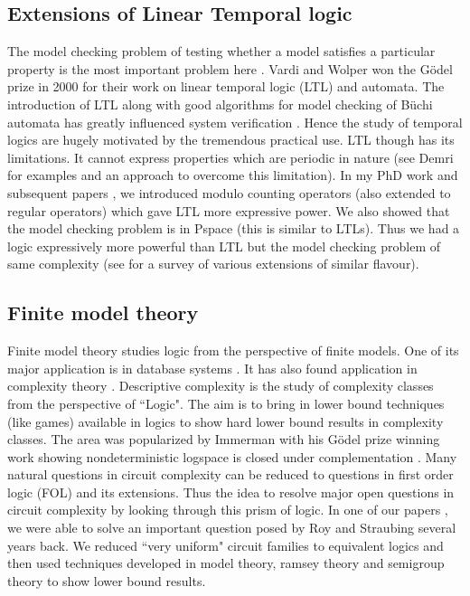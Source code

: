 \documentclass[a4paper,10pt]{article}
\theoremstyle{open}
\begin{document}
\subsection{Extensions of Linear Temporal logic}
The model checking problem of testing whether a model satisfies a particular property is the most important problem here \cite{esparza_unfoldings}. Vardi and Wolper \cite{vardi94ic} won the G\"odel prize in 2000 for their work on linear temporal logic (LTL) and automata. The introduction of LTL along with good algorithms for  model checking of B\"uchi automata has greatly influenced system verification \cite{vardi95}. Hence the study of temporal logics are hugely motivated by the tremendous practical use. LTL though has its limitations. It cannot express properties which are periodic in nature (see Demri \cite{demri_ltlPeriod} for examples and an approach to overcome this limitation). In my PhD work \cite{sav_thesis} and subsequent papers \cite{my_ltlmod,my_ltlsuccinct}, we introduced modulo counting operators (also extended to regular operators) which gave LTL more expressive power. We also showed that the model checking problem is in Pspace (this is similar to LTLs). Thus we had a logic expressively more powerful than LTL but the model checking problem of same complexity (see \cite{demri_presburger} for a survey of various extensions of similar flavour).

\subsection{Finite model theory}
Finite model theory studies logic from the perspective of finite models. One of its major application is in database systems \cite{vianu_bookDB}. It has also found application in complexity theory \cite{immerman_book}. Descriptive complexity is the study of complexity classes from the perspective of ``Logic". The aim is to bring in lower bound techniques (like games) available in logics to show hard lower bound results in complexity classes. The area was popularized by Immerman with his G\"odel prize winning work showing nondeterministic logspace is closed under complementation \cite{immerman_book}. Many natural questions in circuit complexity can be reduced to questions in first order logic (FOL) and its extensions. Thus the idea to resolve major open questions in circuit complexity by looking through this prism of logic. In one of our papers \cite{my_foplus}, we were able to solve an important question posed by Roy and Straubing \cite{roy_defGenFO} several years back. We reduced ``very uniform" circuit families to equivalent logics and then used techniques developed in model theory, ramsey theory and semigroup theory to show lower bound results.
\end{document}
